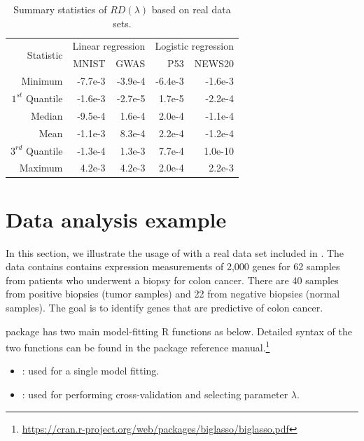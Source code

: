 \begin{table}[h]
\centering
  \begin{tabular}{r|rr|rr}
    \toprule
    \multirow{2}{*}{Statistic} &
      \multicolumn{2}{c|}{Linear regression} &
      \multicolumn{2}{c}{Logistic regression} \\
    	  & MNIST & GWAS & P53 & NEWS20 \\
      \midrule
    Minimum           & -7.7e-3 & -3.9e-4 & -6.4e-3 & -1.6e-3  \\
    $1^{st}$ Quantile & -1.6e-3 & -2.7e-5 &  1.7e-5 & -2.2e-4  \\
    Median            & -9.5e-4 &  1.6e-4 &  2.0e-4 & -1.1e-4  \\
    Mean              & -1.1e-3 &  8.3e-4 &  2.2e-4 & -1.2e-4  \\
    $3^{rd}$ Quantile & -1.3e-4 &  1.3e-3 &  7.7e-4 &  1.0e-10 \\
    Maximum           &  4.2e-3 &  4.2e-3 &  2.0e-4 &  2.2e-3  \\
    \bottomrule
  \end{tabular}
\caption{Summary statistics of $RD(\lambda)$ based on real data sets.}
\label{tab_real_valid}
\end{table}

\section{Data analysis example}

In this section, we illustrate the usage of  with a real data set  included in . The  data contains contains expression measurements of 2,000 genes for 62 samples from patients who underwent a biopsy for colon cancer. There are 40 samples from positive biopsies (tumor samples) and 22 from negative biopsies (normal samples). The goal is to identify genes that are predictive of colon cancer.

 package has two main model-fitting R functions as below. Detailed syntax of the two functions can be found in the package reference manual.\footnote{\url{https://cran.r-project.org/web/packages/biglasso/biglasso.pdf}}
\begin{itemize}
\item {}: used for a single model fitting.
\item {}: used for performing cross-validation and selecting parameter $\lambda$.
\end{itemize}

